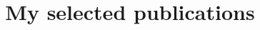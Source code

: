 \documentclass[conference]{article}
\begin{document}
\title{My selected publications
\cite{Cetic_Popovic_Djukic_Kovacevic_2015}
\cite{djukic2014embedded}
\cite{Krunic_Popovic_Krunic_Cetic_2016}
\cite{2024_stojanovic_cetic}
\cite{2023_stojanovic}
\cite{2020_stevic}
}

\maketitle




\end{document}
